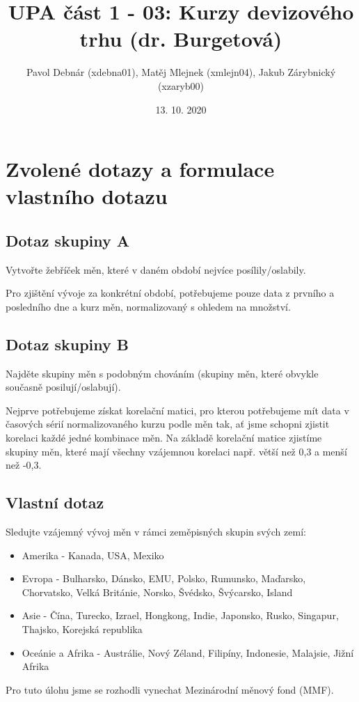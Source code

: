 \documentclass{article}
\title{UPA část 1 - 03: Kurzy devizového trhu (dr. Burgetová)}
\author{Pavol Debnár (xdebna01), Matěj Mlejnek (xmlejn04), Jakub Zárybnický (xzaryb00)}
\date{13. 10. 2020}
\begin{document}
\maketitle

\section{Zvolené dotazy a formulace vlastního dotazu}
\subsection{Dotaz skupiny A}
Vytvořte žebříček měn, které v daném období nejvíce posílily/oslabily.

Pro zjištění vývoje za konkrétní období, potřebujeme pouze data z prvního a posledního dne a kurz měn, normalizovaný s ohledem na množství.

\subsection{Dotaz skupiny B}
Najděte skupiny měn s podobným chováním (skupiny měn, které obvykle současně posilují/oslabují).

Nejprve potřebujeme získat korelační matici, pro kterou potřebujeme mít data v časových sérií normalizovaného kurzu podle měn tak, ať jsme schopni zjistit korelaci každé jedné kombinace měn. Na základě korelační matice zjistíme skupiny měn, které mají všechny vzájemnou korelaci např. větší než 0,3 a menší než -0,3.

\subsection{Vlastní dotaz}
Sledujte vzájemný vývoj měn v rámci zeměpisných skupin svých zemí:

\begin{itemize}
    \item Amerika - Kanada, USA, Mexiko
    \item Evropa - Bulharsko, Dánsko, EMU, Polsko, Rumunsko, Maďarsko, Chorvatsko, Velká Británie, Norsko, Švédsko, Švýcarsko, Island
    \item Asie - Čína, Turecko, Izrael, Hongkong, Indie, Japonsko, Rusko, Singapur, Thajsko, Korejská republika
    \item Oceánie a Afrika - Austrálie, Nový Zéland, Filipíny, Indonesie, Malajsie, Jižní Afrika
\end{itemize}

Pro tuto úlohu jsme se rozhodli vynechat Mezinárodní měnový fond (MMF).
\end{document}
